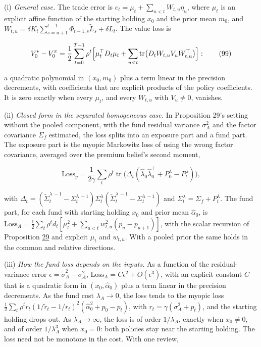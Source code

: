 \documentclass[11pt]{article}
\begin{document}
(i) \emph{General case.} The trade error is
\(e_t=\mu_t+\sum_{u<t}W_{t,u}\eta_u\), where \(\mu_t\) is an explicit affine
function of the starting holding \(x_0\) and the prior mean \(m_0\), and
\(W_{t,u}=\delta K_t\sum_{s=u+1}^{t-1}\Phi_{t-1,s}\tilde L_s+\delta L_t\). The value
loss is

\begin{equation*}
V^*_0-V^\pi_0=\frac12\sum_{t=0}^{T-1}\rho^t\Bigl[\mu_t^\top D_t\mu_t
 +\sum_{u<t}\operatorname{tr}\bigl(D_tW_{t,u}V_uW_{t,u}^\top\bigr)\Bigr]:\tag{99}\label{eq:99}
\end{equation*}

a quadratic polynomial in \((x_0,m_0)\) plus a term linear in the
precision decrements, with coefficients that are explicit products of
the policy coefficients. It is zero exactly when every \(\mu_t\), and
every \(W_{t,u}\) with \(V_u\neq0\), vanishes.

(ii) \emph{Closed form in the separated homogeneous case.} In Proposition
29's setting without the pooled component, with the fund residual
variance \(\sigma_A^2\) and the factor covariance \(\Sigma_f\) estimated, the
loss splits into an exposure part and a fund part. The exposure part
is the myopic Markowitz loss of using the wrong factor covariance,
averaged over the premium belief's second moment,

\begin{equation*}
\mathrm{Loss}_y=\frac1{2\gamma}\sum_t\rho^t
 \operatorname{tr}\bigl(\Delta_t(\hat\lambda_0\hat\lambda_0^\top+P^\lambda_0-P^\lambda_t)\bigr),\tag{100}\label{eq:100}
\end{equation*}

with \(\Delta_t=(\tilde\Sigma^{\lambda\,-1}_t-\Sigma^{\lambda\,-1}_t)\Sigma^\lambda_t
(\tilde\Sigma^{\lambda\,-1}_t-\Sigma^{\lambda\,-1}_t)\) and \(\Sigma^\lambda_t=\Sigma_f+P^\lambda_t\). The
fund part, for each fund with starting holding \(x_0\) and prior mean
\(\hat\alpha_0\), is
\(\mathrm{Loss}_A=\frac12\sum_t\rho^td_t[\mu_t^2+\sum_{u<t}w_{t,u}^2(p_u-p_{u+1})]\),
with the scalar recursion of Proposition \hyperref[res:Proposition-29]{29} and explicit \(\mu_t\) and
\(w_{t,u}\). With a pooled prior the same holds in the common and
relative directions.

(iii) \emph{How the fund loss depends on the inputs.} As a function of the
residual-variance error \(\epsilon=\tilde\sigma_A^2-\sigma_A^2\),
\(\mathrm{Loss}_A=C\epsilon^2+O(\epsilon^3)\), with an explicit constant \(C\) that is a
quadratic form in \((x_0,\hat\alpha_0)\) plus a term linear in the precision
decrements. As the fund cost \(\lambda_A\to0\), the loss tends to the
myopic loss \(\frac12\sum_t\rho^tr_t(1/\tilde r_t-1/r_t)^2(\hat\alpha_0^2+p_0-p_t)\),
with \(r_t=\gamma(\sigma_A^2+p_t)\), and the starting holding drops out. As
\(\lambda_A\to\infty\), the loss is of order \(1/\lambda_A\), exactly when \(x_0\neq0\),
and of order \(1/\lambda_A^3\) when \(x_0=0\): both policies stay near the
starting holding. The loss need not be monotone in the cost. With one
review,
\end{document}

